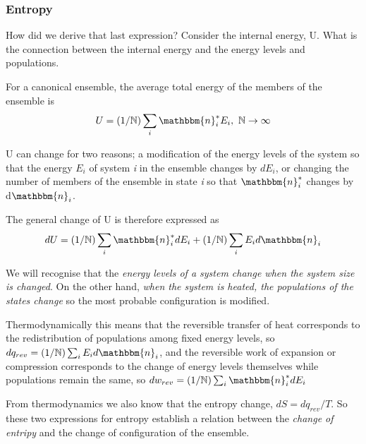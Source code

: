 \documentclass[a4paper,12pt,titlepage]{article}
\begin{document}

\begin{frame}
\frametitle{Entropy}

How did we derive that last expression? Consider the internal energy, U. What is the connection between the internal energy and the energy levels and populations. 

For a canonical ensemble, the average total energy of the members of the ensemble is
\[U = (1/\mathbb{N})\sum_i\mathbbm{n}_i^*E_i,\ \mathbb{N}\rightarrow\infty\]

U can change for two reasons; a modification of the energy levels of the system so that the energy  \(E_i\) of system \textit{i} in the ensemble changes by \(dE_i\), or changing the number of members of the ensemble in state \textit{i} so that \(\mathbbm{n}_i^*\) changes by d\(\mathbbm{n}_i\).

The general change of U is therefore expressed as 
\[dU = (1/\mathbb{N})\sum_i\mathbbm{n}_i^*dE_i+ (1/\mathbb{N})\sum_iE_id\mathbbm{n}_i\]

We will recognise that the \textit{energy levels of a system change when the system size is changed}. On the other hand, \textit{when the system is heated, the populations of the states change} so the most probable configuration is modified. 

Thermodynamically this means that the reversible transfer of heat corresponds to the redistribution of populations among fixed energy levels, so \(dq_{rev} = (1/\mathbb{N})\sum_iE_id\mathbbm{n}_i\), and the reversible work of expansion or compression corresponds to the change of energy levels themselves while populations remain the same, so \(dw_{rev} = (1/\mathbb{N})\sum_i\mathbbm{n}_i^*dE_i\)

From thermodynamics we also know that  the entropy change, \(dS = dq_{rev}/T\). So these two expressions for entropy establish a relation between the \textit{change of entripy} and the change of configuration of the ensemble.

\vspace{5pt}


\end{frame}
\end{document}
